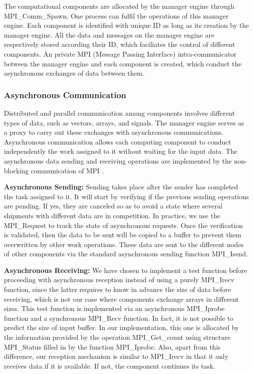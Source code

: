 The computational components are allocated by the manager engine through MPI\_Comm\_Spawn. One process can fulfil the operations of this manager engine. Each component is identified with unique ID as long as its creation by the manager engine. All the data and messages on the manager engine are respectively stored according their ID, which faciliates the control of different components. An private MPI (Message Passing Interface) intra-communicator between the manager engine and each component is created, which conduct the asynchronous exchanges of data between them.

\subsubsection{Asynchronous Communication}

Distributed and parallel communication among components involves different types of data, such as vectors, arrays, and signals. The manager engine serves as a proxy to carry out these exchanges with asynchronous communications. Asynchronous communication allows each computing component to conduct independently the work assigned to it without waiting for the input data. The asynchronous data sending and receiving operations are implemented by the non-blocking communication of MPI . 

\textbf{Asynchronous Sending:} Sending takes place after the sender has completed the task assigned to it. It will start by verifying if the previous sending operations are pending. If yes, they are canceled so as to avoid a state where several shipments with different data are in competition. In practice, we use the MPI\_Request to track the state of asynchronous requests. Once the verification is validated, then the data to be sent will be copied to a buffer to prevent them overwritten by other work operations. These data are sent to the different nodes of other components via the standard asynchronous sending function MPI\_Isend.

\textbf{Asynchronous Receiving:} We have chosen to implement a test function before proceeding with asynchronous reception instead of using a purely MPI\_Irecv function, since the latter requires to know in advance the size of data  before receiving, which is not our case where components exchange arrays in different sizes. This test function is implemented via an asynchronous MPI\_Iprobe function and a synchronous MPI\_Recv function. In fact, it is not possible to predict the size of input buffer. In our implementation, this one is allocated by the information provided by the operation MPI\_Get\_count using structure MPI\_Status filled in by the function MPI\_Iprobe. Also, apart from this difference, our reception mechanism is similar to MPI\_Irecv in that it only receives data if it is available. If not, the component continues its task. 

